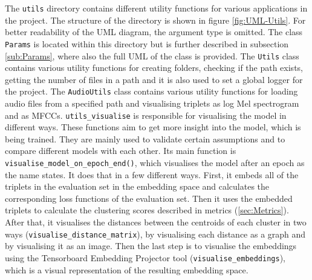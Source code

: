 \noindent
The \texttt{utils} directory contains different utility functions for various applications in the project. The structure of the directory is shown in figure \ref{fig:UML-Utils}. For better readability of the UML diagram, the argument type is omitted. The class \texttt{Params} is located within this directory but is further described in subsection \ref{sub:Params}, where also the full UML of the class is provided.
\newline
\newline
The \texttt{Utils} class contains various utility functions for creating folders, checking if the path exists, getting the number of files in a path and it is also used to set a global logger for the project.
\newline
\newline
The \texttt{AudioUtils} class contains various utility functions for loading audio files from a specified path and visualising triplets as log Mel spectrogram and as \glspl{MFCC}.
\newline
\newline
\texttt{utils\_visualise} is responsible for visualising the model in different ways. These functions aim to get more insight into the model, which is being trained. They are mainly used to validate certain assumptions and to compare different models with each other. Its main function is \texttt{visualise\_model\_on\_epoch\_end()}, which visualises the model after an epoch as the name states. It does that in a few different ways. First, it embeds all of the triplets in the evaluation set in the embedding space and calculates the corresponding loss functions of the evaluation set. Then it uses the embedded triplets to calculate the clustering scores described in metrics (\ref{sec:Metrics}). After that, it visualises the distances between the centroids of each cluster in two ways (\texttt{visualise\_distance\_matrix}), by visualising each distance as a graph and by visualising it as an image. Then the last step is to visualise the embeddings using the Tensorboard Embedding Projector tool (\texttt{visualise\_embeddings}), which is a visual representation of the resulting embedding space.

